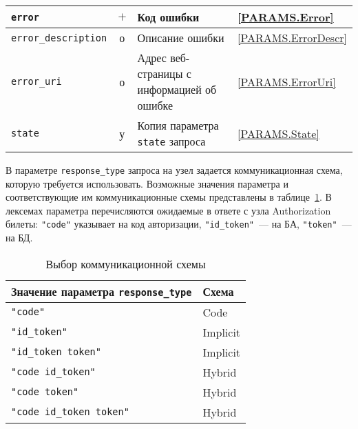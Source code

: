 \begin{table}[p]
\begin{tabular}{|l|c|p{9.0cm}|l|}
\hline
\hline
%
\lstinline!error! & $+$ & 
Код ошибки & 
\ref{PARAMS.Error}\\
\hline
%
\lstinline!error_description! & о & 
Описание ошибки &
\ref{PARAMS.ErrorDescr}\\
\hline
%
\lstinline!error_uri! & о & 
Адрес веб-страницы с информацией об ошибке &
\ref{PARAMS.ErrorUri}\\
\hline
%
\lstinline!state! & у & 
Копия параметра \lstinline!state! запроса &  
\ref{PARAMS.State}\\
\hline
\end{tabular}
\end{table}

В параметре \lstinline{response_type} запроса на узел
задается коммуникационная схема, которую требуется использовать.
%
Возможные значения параметра и соответствующие им коммуникационные схемы 
представлены в таблице~\ref{Table.OIDC.RespType}. 
%
В лексемах параметра перечисляются ожидаемые в ответе с узла 
Authorization билеты: \lstinline{"code"} указывает на код 
авторизации, \lstinline{"id_token"}~--- на БА, \lstinline{"token"}~--- на БД.

\begin{table}[hbt]
\caption{Выбор коммуникационной схемы}\label{Table.OIDC.RespType}
\begin{tabular}{|l|l|}
\hline
Значение параметра \lstinline!response_type! & Схема\\
\hline
\hline
\lstinline!"code"! & Code \\
\lstinline!"id_token"! & Implicit \\
\lstinline!"id_token token"! & Implicit \\
\lstinline!"code id_token"! & Hybrid \\
\lstinline!"code token"! & Hybrid \\
\lstinline!"code id_token token"! & Hybrid \\
\hline
\end{tabular}
\end{table}


